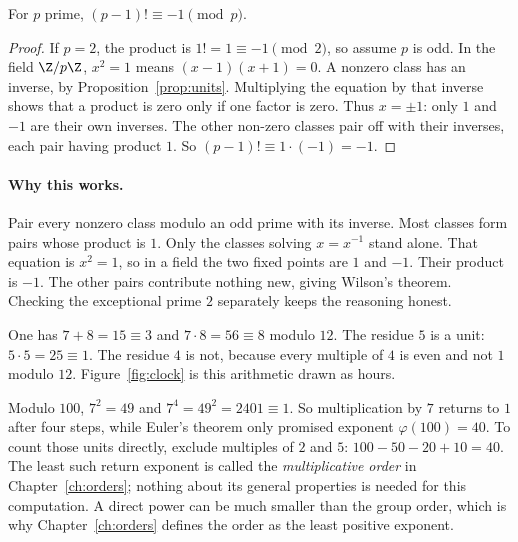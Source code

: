 \begin{theorem}[Wilson]\label{thm:wilson}
For $p$ prime, $(p-1)!\equiv-1\pmod p$.
\end{theorem}
\begin{proof}
If $p=2$, the product is $1!=1\equiv-1\pmod2$, so assume $p$ is odd. In the field $\Z/p\Z$, $x^2=1$ means $(x-1)(x+1)=0$. A nonzero class has an inverse, by Proposition~\ref{prop:units}. Multiplying the equation by that inverse shows that a product is zero only if one factor is zero. Thus $x=\pm1$: only $1$ and $-1$ are their own inverses. The other non-zero classes pair off with their inverses, each pair having product $1$. So $(p-1)!\equiv1\cdot(-1)=-1$.
\end{proof}

\paragraph{Why this works.}
Pair every nonzero class modulo an odd prime with its inverse. Most classes form pairs whose product is $1$. Only the classes solving $x=x^{-1}$ stand alone. That equation is $x^2=1$, so in a field the two fixed points are $1$ and $-1$. Their product is $-1$. The other pairs contribute nothing new, giving Wilson's theorem. Checking the exceptional prime $2$ separately keeps the reasoning honest.

\begin{examplex}
One has $7+8=15\equiv 3$ and $7\cdot 8=56\equiv 8$ modulo $12$. The residue $5$ is a unit: $5\cdot 5=25\equiv 1$. The residue $4$ is not, because every multiple of $4$ is even and not $1$ modulo $12$. Figure~\ref{fig:clock} is this arithmetic drawn as hours.
\end{examplex}

\begin{examplex}
Modulo $100$, $7^2=49$ and $7^4=49^2=2401\equiv 1$. So multiplication by $7$ returns to $1$ after four steps, while Euler's theorem only promised exponent $\varphi(100)=40$. To count those units directly, exclude multiples of $2$ and $5$: $100-50-20+10=40$. The least such return exponent is called the \emph{multiplicative order} in Chapter~\ref{ch:orders}; nothing about its general properties is needed for this computation. A direct power can be much smaller than the group order, which is why Chapter~\ref{ch:orders} defines the order as the least positive exponent.
\end{examplex}

